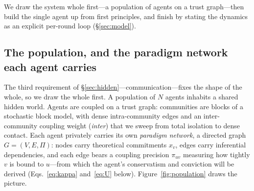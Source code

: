 \documentclass[runningheads]{llncs}
\begin{document}
We draw the system whole first---a population of agents on a trust graph---then build the single
agent up from first principles, and finish by stating the dynamics as an explicit per-round loop
(\S\ref{sec:model}).

\subsection{The population, and the paradigm network each agent carries}
\label{sec:carryover}

The third requirement of \S\ref{sec:hidden}---communication---fixes the shape of the whole, so we
draw the whole first. A population of $N$ agents inhabits a shared hidden world. Agents are
coupled on a trust graph: communities are blocks of a stochastic block model, with dense
intra-community edges and an inter-community coupling weight (\emph{inter}) that we sweep from
total isolation to dense contact. Each agent privately carries its own \emph{paradigm network}, a directed graph
$G=(V,E,\Pi)$: nodes carry theoretical commitments $x_v$, edges carry inferential dependencies,
and each edge bears a coupling precision $\pi_{uv}$ measuring how tightly $v$ is bound to
$u$---from which the agent's conservatism and conviction will be derived (Eqs.~\ref{eq:kappa}
and~\ref{eq:U} below). Figure~\ref{fig:population} draws the picture.
\end{document}
